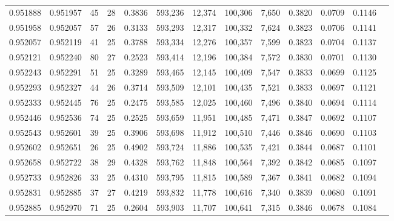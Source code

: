 \begin{tabular}{rrrrrrrrrrrrr}
0.951888 & 0.951957 &    45 &  28 &                                     0.3836 & 593,236 &  12,374 & 100,306 &   7,650 & 0.3820 & 0.0709 & 0.1146 \\
0.951958 & 0.952057 &    57 &  26 &                                     0.3133 & 593,293 &  12,317 & 100,332 &   7,624 & 0.3823 & 0.0706 & 0.1141 \\
0.952057 & 0.952119 &    41 &  25 &                                     0.3788 & 593,334 &  12,276 & 100,357 &   7,599 & 0.3823 & 0.0704 & 0.1137 \\
0.952121 & 0.952240 &    80 &  27 &                                     0.2523 & 593,414 &  12,196 & 100,384 &   7,572 & 0.3830 & 0.0701 & 0.1130 \\
0.952243 & 0.952291 &    51 &  25 &                                     0.3289 & 593,465 &  12,145 & 100,409 &   7,547 & 0.3833 & 0.0699 & 0.1125 \\
0.952293 & 0.952327 &    44 &  26 &                                     0.3714 & 593,509 &  12,101 & 100,435 &   7,521 & 0.3833 & 0.0697 & 0.1121 \\
0.952333 & 0.952445 &    76 &  25 &                                     0.2475 & 593,585 &  12,025 & 100,460 &   7,496 & 0.3840 & 0.0694 & 0.1114 \\
0.952446 & 0.952536 &    74 &  25 &                                     0.2525 & 593,659 &  11,951 & 100,485 &   7,471 & 0.3847 & 0.0692 & 0.1107 \\
0.952543 & 0.952601 &    39 &  25 &                                     0.3906 & 593,698 &  11,912 & 100,510 &   7,446 & 0.3846 & 0.0690 & 0.1103 \\
0.952602 & 0.952651 &    26 &  25 &                                     0.4902 & 593,724 &  11,886 & 100,535 &   7,421 & 0.3844 & 0.0687 & 0.1101 \\
0.952658 & 0.952722 &    38 &  29 &                                     0.4328 & 593,762 &  11,848 & 100,564 &   7,392 & 0.3842 & 0.0685 & 0.1097 \\
0.952733 & 0.952826 &    33 &  25 &                                     0.4310 & 593,795 &  11,815 & 100,589 &   7,367 & 0.3841 & 0.0682 & 0.1094 \\
0.952831 & 0.952885 &    37 &  27 &                                     0.4219 & 593,832 &  11,778 & 100,616 &   7,340 & 0.3839 & 0.0680 & 0.1091 \\
0.952885 & 0.952970 &    71 &  25 &                                     0.2604 & 593,903 &  11,707 & 100,641 &   7,315 & 0.3846 & 0.0678 & 0.1084 \\

\end{tabular}
